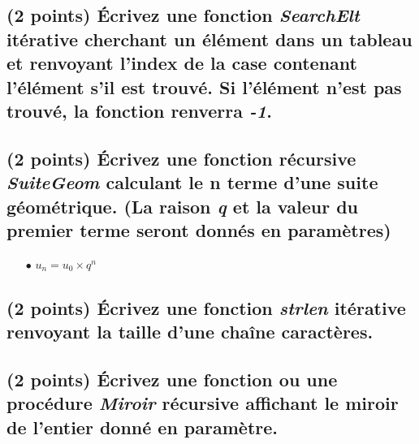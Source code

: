 \documentclass[11pt,a4paper]{article}
\begin{document}
\bigskip

\begin{center}
\end{center}

\bigskip

\subsection{(2 points) \'Ecrivez une fonction \og \textit{SearchElt} \fg{} itérative cherchant un élément dans un tableau et renvoyant l'index de la case contenant l'élément s'il est trouvé. Si l'élément n'est pas trouvé, la fonction renverra \textit{-1}. }

\bigskip

\begin{center}
\end{center}

\bigskip

\subsection{(2 points) \'Ecrivez une fonction récursive \og \textit{SuiteGeom} \fg{} calculant le n terme d'une suite géométrique. (La raison \textit{q} et la valeur du premier terme seront donnés en paramètres) }

\begin{itemize}
\item[$\bullet$] $ u_{n} = u_{0} \times q^{n} $
\end{itemize}

\bigskip

\begin{center}
\end{center}

\bigskip

\subsection{(2 points) \'Ecrivez une fonction \og \textit{strlen} \fg{} itérative renvoyant la taille d'une chaîne caractères. }

\bigskip

\begin{center}
\end{center}

\bigskip

\subsection{(2 points) \'Ecrivez une fonction ou une procédure \og \textit{Miroir} \fg{} récursive affichant le miroir de l'entier donné en paramètre. }
\end{document}
